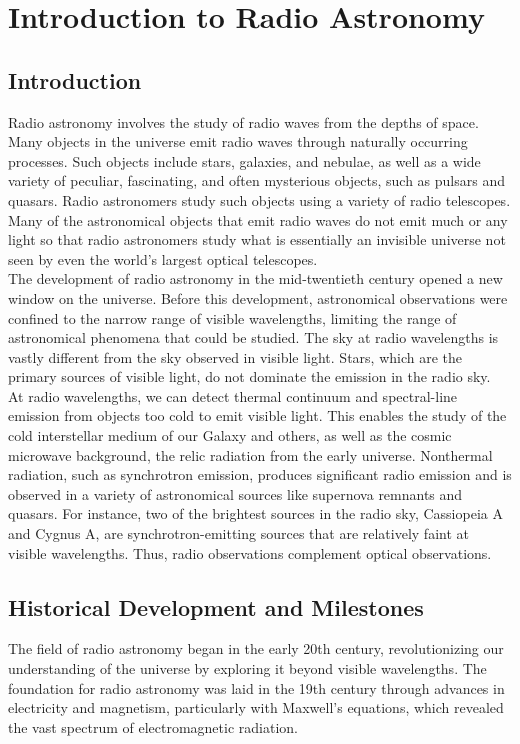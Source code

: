 \chapter{Introduction to Radio Astronomy}

\section{Introduction}
Radio astronomy involves the study of radio waves from the depths of space. Many objects in the universe emit radio waves through naturally occurring processes. Such objects include stars, galaxies, and nebulae, as well as a wide variety of peculiar, fascinating, and often mysterious objects, such as pulsars and quasars. Radio astronomers study such objects using a variety of radio telescopes. Many of the astronomical objects that emit radio waves do not emit much or any light so that radio astronomers study what is essentially an invisible universe not seen by even the world’s largest optical telescopes. \\

The development of radio astronomy in the mid-twentieth century opened a new window on the universe. Before this development, astronomical observations were confined to the narrow range of visible wavelengths, limiting the range of astronomical phenomena that could be studied. The sky at radio wavelengths is vastly different from the sky observed in visible light. Stars, which are the primary sources of visible light, do not dominate the emission in the radio sky. \\

At radio wavelengths, we can detect thermal continuum and spectral-line emission from objects too cold to emit visible light. This enables the study of the cold interstellar medium of our Galaxy and others, as well as the cosmic microwave background, the relic radiation from the early universe. Nonthermal radiation, such as synchrotron emission, produces significant radio emission and is observed in a variety of astronomical sources like supernova remnants and quasars. For instance, two of the brightest sources in the radio sky, Cassiopeia A and Cygnus A, are synchrotron-emitting sources that are relatively faint at visible wavelengths. Thus, radio observations complement optical observations. \\

\section{Historical Development and Milestones}
The field of radio astronomy began in the early 20th century, revolutionizing our understanding of the universe by exploring it beyond visible wavelengths. The foundation for radio astronomy was laid in the 19th century through advances in electricity and magnetism, particularly with Maxwell's equations, which revealed the vast spectrum of electromagnetic radiation.

